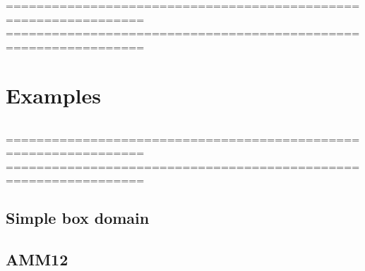 %
================================================================
%
================================================================
\chapter{Examples}
\label{eq}

$\ $\newline    %



%
\noindent ================================================================
%
================================================================

\section{Simple box domain}
\label{box}

\section{AMM12}
\label{amm}







